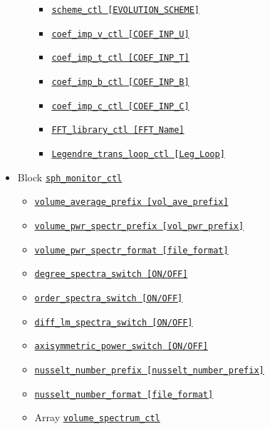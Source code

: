\begin{itemize}
\begin{itemize}
		\begin{itemize} \label{href_i:time_loop_ctl}
		\item \hyperref[href_t:scheme_ctl]{\tt scheme\_ctl              [EVOLUTION\_SCHEME]}
		\item \hyperref[href_t:coef_imp_v_ctl]{\tt coef\_imp\_v\_ctl    [COEF\_INP\_U]}
		\item \hyperref[href_t:coef_imp_t_ctl]{\tt coef\_imp\_t\_ctl    [COEF\_INP\_T]}
		\item \hyperref[href_t:coef_imp_b_ctl]{\tt coef\_imp\_b\_ctl    [COEF\_INP\_B]}
		\item \hyperref[href_t:coef_imp_c_ctl]{\tt coef\_imp\_c\_ctl    [COEF\_INP\_C]}
		\item \hyperref[href_t:FFT_library_ctl]{\tt FFT\_library\_ctl   [FFT\_Name]}
		\item \hyperref[href_t:Legendre_trans_loop_ctl]
			{\tt Legendre\_trans\_loop\_ctl [Leg\_Loop]}
		\end{itemize}
%
	\end{itemize}
%
\item Block \hyperref[href_t:sph_monitor_ctl]{\tt sph\_monitor\_ctl}
	\begin{itemize} \label{href_i:sph_monitor_ctl}
	\item \hyperref[href_t:volume_average_prefix]
			{\tt volume\_average\_prefix        [vol\_ave\_prefix]}
	\item \hyperref[href_t:volume_pwr_spectr_prefix]
			{\tt volume\_pwr\_spectr\_prefix    [vol\_pwr\_prefix]}
	\item \hyperref[href_t:volume_pwr_spectr_format]
		{\tt volume\_pwr\_spectr\_format    [file\_format]}
	\item \hyperref[href_t:degree_spectra_switch]
		{\tt degree\_spectra\_switch           [ON/OFF]}
	\item \hyperref[href_t:order_spectra_switch]
		{\tt order\_spectra\_switch           [ON/OFF]}
	\item \hyperref[href_t:diff_lm_spectra_switch]
		{\tt diff\_lm\_spectra\_switch           [ON/OFF]}
	\item \hyperref[href_t:axisymmetric_power_switch]
		{\tt axisymmetric\_power\_switch           [ON/OFF]}
%
	\item \hyperref[href_t:nusselt_number_prefix]
			{\tt nusselt\_number\_prefix        [nusselt\_number\_prefix]}
	\item \hyperref[href_t:nusselt_number_format]
			{\tt nusselt\_number\_format    [file\_format]}
%
	\item Array \hyperref[href_t:volume_spectrum_ctl]{\tt volume\_spectrum\_ctl}

\end{itemize}
\end{itemize}
